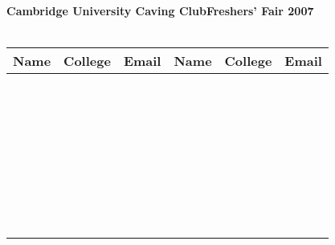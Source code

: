 \documentclass[a4paper,landscape,12pt]{report}
\begin{document}
\pagestyle{empty}
{\Large\bf Cambridge University Caving Club\hfill Freshers' Fair 2007}\\\
\begin{tabularx}{\textwidth}{|p{5cm}|p{4cm}|X||p{5cm}|p{4cm}|X|}
\hline
{\bf Name} & {\bf College} & {\bf Email} & {\bf Name} & {\bf College} & {\bf Email}\\\hline\hline
& & & & & \\& & & & & \\\hline
& & & & & \\& & & & & \\\hline
& & & & & \\& & & & & \\\hline
& & & & & \\& & & & & \\\hline
& & & & & \\& & & & & \\\hline
& & & & & \\& & & & & \\\hline
& & & & & \\& & & & & \\\hline
& & & & & \\& & & & & \\\hline
& & & & & \\& & & & & \\\hline
& & & & & \\& & & & & \\\hline
& & & & & \\& & & & & \\\hline
& & & & & \\& & & & & \\\hline
& & & & & \\& & & & & \\\hline
& & & & & \\& & & & & \\\hline
& & & & & \\& & & & & \\\hline
& & & & & \\& & & & & \\\hline
& & & & & \\& & & & & \\\hline
\end{tabularx}
\end{document}
